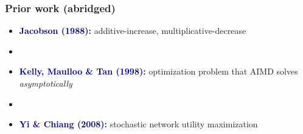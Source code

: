 \documentclass[svgnames]{beamer}
\begin{document}

\begin{frame}
\frametitle{Prior work (abridged)}

\begin{itemize}

\item {\bf \textcolor{DarkBlue}{Jacobson (1988):}} additive-increase, multiplicative-decrease

\item[]

\item {\bf \textcolor{DarkBlue}{Kelly, Maulloo \& Tan (1998):}} optimization problem that AIMD solves {\it asymptotically}

\item[]

\item {\bf \textcolor{DarkBlue}{Yi \& Chiang (2008):}} stochastic network utility maximization

\end{itemize}

\end{frame}
\end{document}
